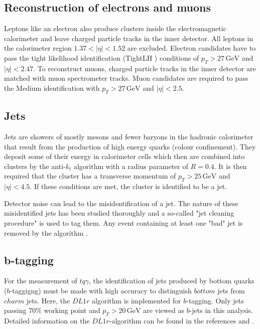 \subsection{Reconstruction of electrons and muons}
\label{sec:reconlepton}

Leptons like an electron also produce clusters inside the electromagnetic calorimeter and leave charged particle tracks in the inner detector. All leptons in the calorimeter region $1.37 < |\eta| < 1.52$ are excluded. Electron candidates have to pass the tight likelihood identification (TightLH \cite{TightLH}) conditions of $p_T > 27 \,\si{\giga\electronvolt}$ and $|\eta| < 2.47$. 
To reconstruct muons, charged particle tracks in the inner detector are matched with muon spectrometer tracks. Muon candidates are required to pass the Medium identification \cite{Medium} with $p_T > 27 \,\si{\giga\electronvolt}$ and $|\eta| < 2.5$.

\subsection{Jets}
\label{sec:jets}
Jets are showers of mostly mesons and fewer baryons in the hadronic calorimeter that result from the production of high energy quarks (colour confinement). They deposit some of their energy in calorimeter cells which then are combined into clusters by the anti-$k_t$ algorithm \cite{anti_k_t} with a radius parameter of $R = 0.4$. 
It is then required that the cluster has a transverse momentum of $p_T > 25 \,\si{\giga\electronvolt}$ and $\bigl|\eta\bigr| < 4.5$. If these conditions are met, the cluster is identified to be a jet.

Detector noise can lead to the misidentification of a jet. The nature of these misidentified jets has been studied thoroughly and a so-called "jet cleaning procedure" is used to tag them. 
Any event containing at least one "bad" jet is removed by the algorithm \cite{jetclean}. 
\subsection{b-tagging}
\label{sec:btagging}

For the measurement of $tq\gamma$, the identification of jets produced by bottom quarks ($b$-taggigng) must be made with high accuracy to distinguish $bottom$ jets from $charm$ jets. Here, the $DL1r$ algorithm is implemented for $b$-tagging. 
Only jets passing $70\%$ working point and $p_T >20 \,\si{\giga\electronvolt}$ are viewed as $b$-jets in this analysis. 
Detailed information on the $DL1r$-algorithm can be found in the references \cite{btag1} and \cite{btag2}.

